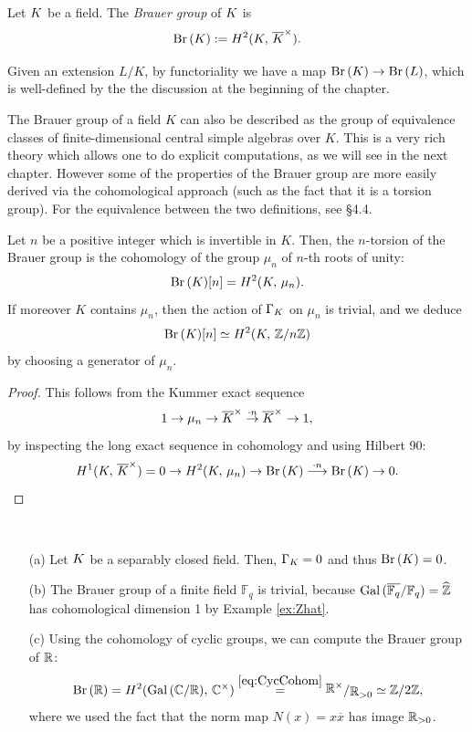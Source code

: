 \documentclass[a4paper, oneside]{memoir}
\begin{document}
\begin{definition}
	Let $K$ be a field. The \textit{Brauer group} of $K$ is
	\[\operatorname{Br}{(K)}:=H^{2}( K, \, \overline{K}^\times ).\]
\end{definition}

\noindent Given an extension $L/K$, by functoriality we have a map $\operatorname{Br}{(K)}\to\operatorname{Br}{(L)}$, which is well-defined by the the discussion at the beginning of the chapter.

\begin{remark}\label{rm:CSA}
	The Brauer group of a field $K$ can also be described as the group of equivalence classes of finite-dimensional central simple algebras over $K$. This is a very rich theory which allows one to do explicit computations, as we will see in the next chapter. However some of the properties of the Brauer group are more easily derived via the cohomological approach (such as the fact that it is a torsion group). For the equivalence between the two definitions, see \cite{GilleSzamuely} \S 4.4.
\end{remark}

\begin{proposition}\label{prop:BrMuN}
	Let $n$ be a positive integer which is invertible in $K$. Then, the $n$-torsion of the Brauer group is the cohomology of the group $\mu_n$ of $n$-th roots of unity:
	\[
		\operatorname{Br}{(K)}[n]=H^{2}( K, \, \mu_n ).
	\]
	If moreover $K$ contains $\mu_n$, then the action of $\Gamma_K$ on $\mu_n$ is trivial, and we deduce
	\[
		\operatorname{Br}{(K)}[n]\simeq H^{2}( K, \, \mathbb{Z}/n\mathbb{Z} )
	\]
	by choosing a generator of $\mu_n$.
\end{proposition}

\begin{proof}
	This follows from the Kummer exact sequence
	\[
		1\to \mu_n\to \overline{K}^\times\overset{\cdot n}{\to} \overline{K}^\times\to 1,
	\]
	by inspecting the long exact sequence in cohomology and using Hilbert 90:
	\[
		H^{1}( K, \, \overline{K}^\times )=0\to H^{2}( K, \, \mu_n )\to \operatorname{Br}{(K)} \overset{\cdot n}{\longrightarrow}\operatorname{Br}{(K)}\to 0.
	\]
\end{proof}

\begin{example}\label{ex:Brauer}\
	\begin{itemize}
		\item[(a)] Let $K$ be a separably closed field. Then, $\Gamma_K=0$ and thus $\operatorname{Br}{(K)}=0$.
		\item[(b)] The Brauer group of a finite field $\mathbb{F}_q$ is trivial, because $\operatorname{Gal}{(\overline{\mathbb{F}_q}/\mathbb{F}_q)}=\widehat{\mathbb{Z}}$ has cohomological dimension 1 by Example \ref{ex:Zhat}.
		\item[(c)] Using the cohomology of cyclic groups, we can compute the Brauer group of $\mathbb{R}$:
		      \[
			      \Br{\R}=\H{2}{\operatorname{Gal}{(\C/\R)}}{\C^\times}\overset{\ref{eq:CycCohom}}{=}\ssfrac{\R^\times}{\R_{>0}}\simeq\Z/2\Z
			      ,\]
		      where we used the fact that the norm map $N(x)=x\overline{x}$ has image $\mathbb{R}_{>0}$.
	\end{itemize}
\end{example}
\end{document}
